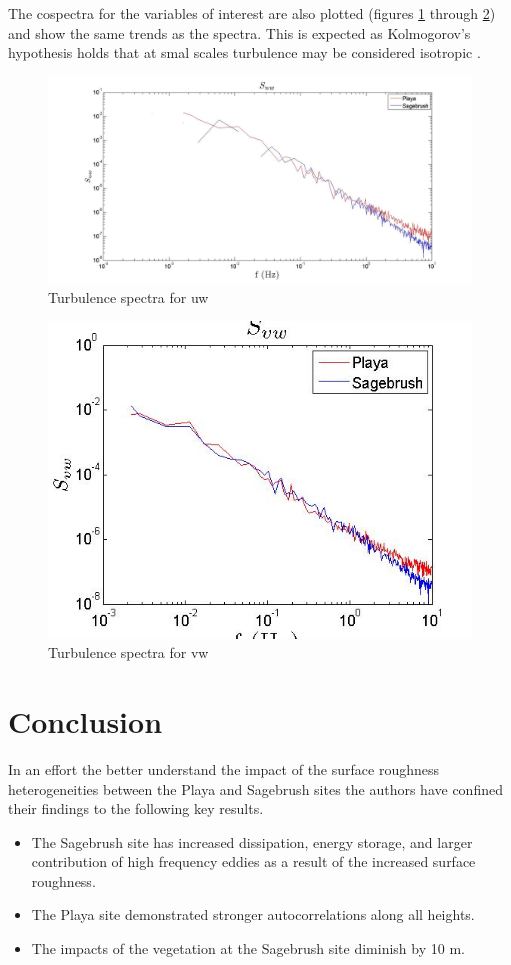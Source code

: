 \documentclass[]{article}
\begin{document}
The cospectra for the variables of interest are also plotted (figures \ref{fig:S_uw10m} through \ref{fig:S_vw10m}) and show the same trends as the spectra. This is expected as Kolmogorov's hypothesis holds that at smal scales turbulence may be considered isotropic \citep{Pope}.
\begin{figure}[h]
	\centering
	\includegraphics[width=\textwidth]{S_uw10m.jpg}
	\caption{Turbulence spectra for uw}
	\label{fig:S_uw10m}
\end{figure}
\begin{figure}[h]
	\centering
	\includegraphics[width=\textwidth]{S_vw10.jpg}
	\caption{Turbulence spectra for vw}
	\label{fig:S_vw10m}
\end{figure}

\section{Conclusion}
 In an effort the better understand the impact of the surface roughness heterogeneities between the Playa and Sagebrush sites the authors have confined their findings to the following key results. 
 \begin{itemize}
 	\item
 	The Sagebrush site has increased dissipation, energy storage, and larger contribution of high frequency eddies as a result of the increased surface roughness.
 	\item
 	The Playa site demonstrated stronger autocorrelations along all heights.
 	\item 
 	The impacts of the vegetation at the Sagebrush site diminish by 10 m.
 \end{itemize}
 
\end{document}
